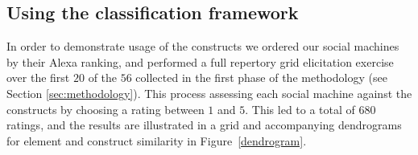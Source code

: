 \documentclass{sig-alternate}
\begin{document}

\subsection{Using the classification framework}
\label{sec:usage}
In order to demonstrate usage of the constructs we ordered our social machines
by their Alexa ranking, and performed a full repertory grid elicitation exercise over the first $20$ of the $56$ collected in the first phase of the methodology (see Section \ref{sec:methodology}). This process assessing each social machine against the constructs by choosing a rating between $1$ and $5$. This led to a total of $680$ ratings, and the
results are illustrated in a grid and accompanying dendrograms for element and construct
similarity in Figure~\ref{dendrogram}.
\end{document}

